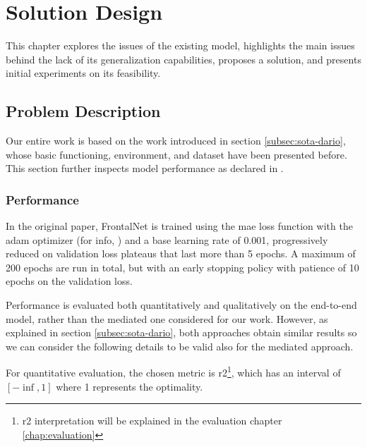 \chapter{Solution Design}
\label{chap:design}


This chapter explores the issues of the existing model, highlights the main issues behind the lack of its generalization capabilities, proposes a solution, and presents initial experiments on its feasibility.




\section{Problem Description}
\label{sec:frontalnet}

Our entire work is based on the work introduced in section \ref{subsec:sota-dario}, whose basic functioning, environment, and dataset have been presented before. This section further inspects model performance as declared in \cite{mantegazza2019visionbased}.



\subsection{Performance}
\label{subsec:frontalnet-performance}

In the original paper, FrontalNet is trained using the \gls{mae} loss function with the \gls{adam} optimizer (for info, \cite{kingma2014adam}) and a base learning rate of 0.001, progressively reduced on validation loss plateaus that last more than 5 epochs. A maximum of 200 epochs are run in total, but with an early stopping policy with patience of 10 epochs on the validation loss. 

Performance is evaluated both quantitatively and qualitatively on the end-to-end model, rather than the mediated one considered for our work. However, as explained in section \ref{subsec:sota-dario}, both approaches obtain similar results so we can consider the following details to be valid also for the mediated approach.

\medskip 

For quantitative evaluation, the chosen metric is \gls{r2}\footnote{\gls{r2} interpretation will be explained in the evaluation chapter \ref{chap:evaluation}}, which has an interval of $[-\inf, 1]$ where 1 represents the optimality. 

